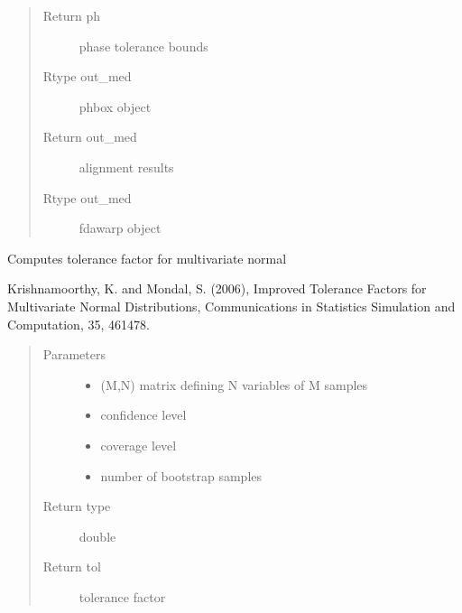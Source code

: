 \documentclass[letterpaper,10pt,english]{sphinxmanual}
\begin{document}
\begin{fulllineitems}
\begin{quote}
\begin{description}
\item[{Return ph}] \leavevmode
phase tolerance bounds

\item[{Rtype out\_med}] \leavevmode
phbox object

\item[{Return out\_med}] \leavevmode
alignment results

\item[{Rtype out\_med}] \leavevmode
fdawarp object

\end{description}\end{quote}

\end{fulllineitems}


\begin{fulllineitems}
\label{\detokenize{tolerance:tolerance.mvtol_region}}
Computes tolerance factor for multivariate normal

Krishnamoorthy, K. and Mondal, S. (2006), Improved Tolerance Factors for Multivariate Normal
Distributions, Communications in Statistics \sphinxhyphen{} Simulation and Computation, 35, 461\textendash{}478.
\begin{quote}\begin{description}
\item[{Parameters}] \leavevmode\begin{itemize}
\item {} 
 \textendash{} (M,N) matrix defining N variables of M samples

\item {} 
 \textendash{} confidence level

\item {} 
 \textendash{} coverage level

\item {} 
 \textendash{} number of bootstrap samples

\end{itemize}

\item[{Return type}] \leavevmode
double

\item[{Return tol}] \leavevmode
tolerance factor

\end{description}\end{quote}

\end{fulllineitems}
\end{document}
